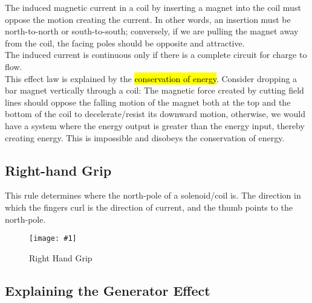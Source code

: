 \documentclass[a4paper,12pt]{article}
\newcommand{\lb}{\\[8pt]}
\newcommand{\img}[4]{\begin{center}
  \begin{figure}[H]
    \centering
    \texttt{[image: \#1]}
    \caption{#3}
    \label{fig:#4}
  \end{figure}
\end{center}}
\begin{document}
The induced magnetic current in a coil by inserting a magnet into the coil must oppose the motion creating the current. In other words, an insertion must be north-to-north or south-to-south; conversely, if we are pulling the magnet away from the coil, the facing poles should be opposite and attractive.\lb
The induced current is continuous only if there is a complete circuit for charge to flow.\lb
This effect law is explained by the \hl{conservation of energy}. Consider dropping a bar magnet vertically through a coil: The magnetic force created by cutting field lines should oppose the falling motion of the magnet both at the top and the bottom of the coil to decelerate/resist its downward motion, otherwise, we would have a system where the energy output is greater than the energy input, thereby creating energy. This is impossible and disobeys the conservation of energy.
\pagebreak

\subsection{Right-hand Grip}

This rule determines where the north-pole of a solenoid/coil is. The direction in which the fingers curl is the direction of current, and the thumb points to the north-pole.

\img{righthandgrip.jpg}{0.65}{Right Hand Grip}{rhgrip}
\pagebreak

\subsection{Explaining the Generator Effect}
\end{document}
